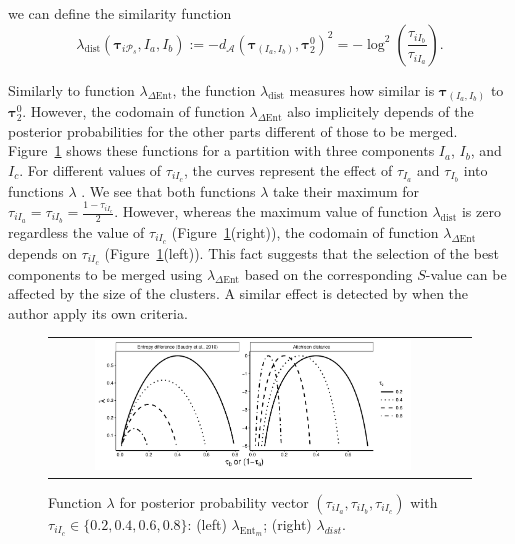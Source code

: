 \documentclass[submit]{smj}
\theoremstyle{definition}
\newcommand{\m}[1]{\boldsymbol{#1}}
\begin{document}
we can define the similarity function
\[
\lambda_{\text{dist}}(\m\tau_{i \mathcal{P}_s},  I_a,  I_b) := -d_\mathcal{A}\left(\m\tau_{\left(I_a, I_b\right)}, \m\tau_2^0 \right)^2 = -\log^2 \left(\frac{ \tau_{iI_b} }{ \tau_{iI_a} }\right).
\]



Similarly to function $\lambda_{\Delta\text{Ent}}$, the function $\lambda_{\text{dist}}$  measures how similar is $\m\tau_{\left(I_a, I_b\right)}$ to $\m\tau_2^0$. However, the codomain of function $\lambda_{\Delta\text{Ent}}$ also implicitely depends of the posterior probabilities for the other parts different of those to be merged. Figure~\ref{symetric} shows these functions for a partition with three components $I_a$, $I_b$, and $I_c$. For different values of $\tau_{iI_c}$, the curves represent the effect of $\tau_{I_a}$ and $\tau_{I_b}$ into functions $\lambda$ . We see that both functions $\lambda$ take their maximum for $\tau_{iI_a}=\tau_{iI_b}=\frac{1-\tau_{i I_c}}{2}$. However, whereas the maximum value of function $\lambda_{\text{dist}}$ is zero regardless the value of $\tau_{iI_c}$ (Figure~\ref{symetric}(right)), the codomain of function $\lambda_{\Delta\text{Ent}}$ depends on $\tau_{iI_c}$ (Figure~\ref{symetric}(left)). This fact suggests that the selection of the best components to be merged using $\lambda_{\Delta\text{Ent}}$ based on the corresponding $S$-value can be affected by the size of the clusters. A similar effect is detected by \cite{baudry2010combining} when the author apply its own criteria.

\begin{figure}[htpb]
\begin{center}
\begin{tabular}{cc}
  \includegraphics[width=0.8\textwidth]{figures/entr_dist.pdf} \\
 \end{tabular}
 \caption{Function $\lambda$ for posterior probability 
vector $\left(\tau_{iI_a}, \tau_{iI_b}, \tau_{iI_c} \right)$ with $\tau_{iI_c} \in \{0.2, 0.4, 0.6, 0.8\}$: (left) $\lambda_{\text{Ent}_m}$; (right) $\lambda_{dist}$.} 
\label{symetric}
\end{center}
\end{figure}
\end{document}
